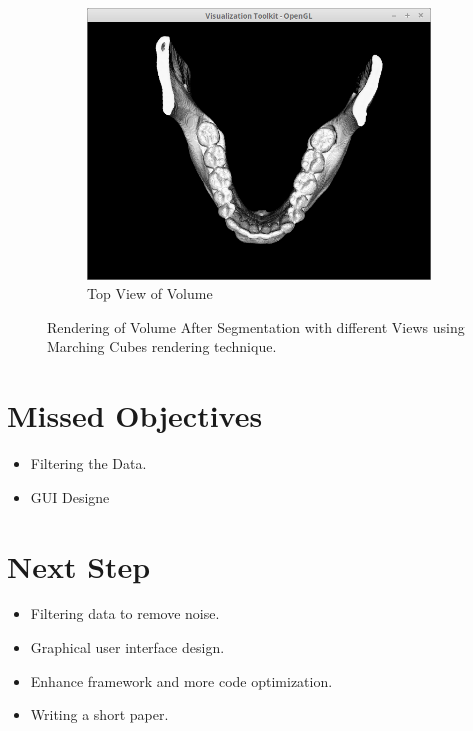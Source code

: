 \documentclass[10pt, b5paper]{article}
\begin{document}
\begin{figure}
\begin{subfigure}[b]{0.33\textwidth}
        \centering
        \includegraphics[width=\textwidth]{MCT}
        \caption{Top View of Volume}
    \end{subfigure}
    \caption{Rendering of Volume After Segmentation with different Views using  Marching Cubes rendering technique.}
    \label{fig:MC}
\end{figure}

\section{Missed Objectives}

\begin{itemize}
\item Filtering the Data.
\item GUI Designe
\end{itemize}

\section{Next Step}
\begin{itemize}
\item Filtering data to remove noise.
\item Graphical user interface design.
\item Enhance framework and more code optimization.
\item Writing a short paper.
\end{itemize}   
    
\end{document}
